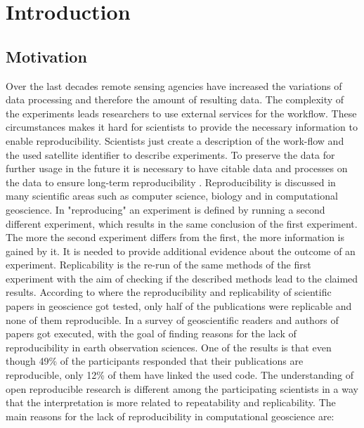 \documentclass[draft,final]{vutinfth} %
\begin{document}

\tableofcontents %

\mainmatter

\chapter{Introduction}\label{Introduction}
\section{Motivation}\label{Motivation}
Over the last decades remote sensing agencies have increased the variations of data processing and therefore the amount of resulting data. The complexity of the experiments leads researchers to use external services for the workflow. These circumstances makes it hard for scientists to provide the necessary information to enable reproducibility. Scientists just create a description of the work-flow and the used satellite identifier to describe experiments. To preserve the data for further usage in the future it is necessary to have citable data and processes on the data to ensure long-term reproducibility \cite{6352411}. Reproducibility is discussed in many scientific areas such as computer science, biology and in computational geoscience. In \cite{reprovsrepli} "reproducing" an experiment is defined by running a second different experiment, which results in the same conclusion of the first experiment. The more the second experiment differs from the first, the more information is gained by it. It is needed to provide additional evidence about the outcome of an experiment. Replicability is the re-run of the same methods of the first experiment with the aim of checking if the described methods lead to the claimed results\cite{reprovsrepli}. According to \cite{Ostermann2017AdvancingSW} where the reproducibility and replicability of scientific papers in geoscience got tested, only half of the publications were replicable and none of them reproducible. In \cite{Thestateofreproducibility} a survey of geoscientific readers and authors of papers got executed, with the goal of finding reasons for the lack of reproducibility in earth observation sciences. One of the results is that even though 49\% of the participants responded that their publications are reproducible, only 12\% of them have linked the used code. The understanding of open reproducible research is different among the participating scientists in a way that the interpretation is more related to repeatability and replicability. The main reasons for the lack of reproducibility in computational geoscience are:
\end{document}
